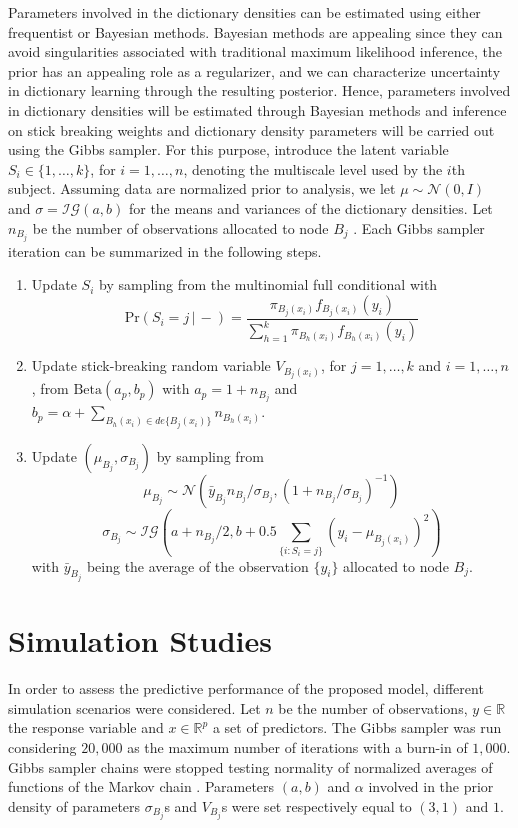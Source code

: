 \documentclass{article}
\newcommand{\Real}{\mathbb{R}}
\providecommand{\mc}[1]{\mathcal{#1}}
\begin{document}
Parameters involved in the dictionary densities can be estimated using either frequentist or Bayesian methods. Bayesian methods are appealing since they can avoid singularities associated with traditional maximum likelihood inference, the prior has an appealing role as a regularizer, and we can characterize uncertainty in dictionary learning through the resulting posterior.
Hence, parameters involved in dictionary densities will be estimated through Bayesian methods and inference on stick breaking weights and dictionary density parameters will be carried out using the Gibbs sampler. For this purpose, introduce the latent variable $S_i \in \{1,\ldots,k\}$, for $i=1,\ldots,n$, denoting the multiscale level used by the $i$th subject.  Assuming data are normalized prior to analysis, we let $\mu \sim \mc{N}(0,I)$ and $\sigma=\mc{IG}(a,b)$ for the means and variances of the dictionary densities. Let $n_{B_j}$ be  the number of observations allocated to node $B_j$ . Each Gibbs sampler iteration can be summarized in the following steps.
\begin{enumerate}
\item Update $S_i$ by sampling from the multinomial full conditional with 
\[\mbox{Pr}( S_i = j\, |\, -) = \frac{ \pi_{B_j(x_i)}f_{B_j(x_i)}(y_i) }{ \sum_{h=1}^k \pi_{B_h(x_i)}f_{B_h(x_i)}(y_i) } \label{eq:prS}\]
\item Update stick-breaking random variable $V_{B_j(x_i)}$, for $j=1, \ldots, k$ and $i=1, \ldots, n$, from $\mbox{Beta}(a_p,b_p)$ with $a_p=1+n_{B_j}$ and $b_p=\alpha+\sum_{B_h(x_i) \in de\{B_j(x_i)\}} n_{B_h(x_i)}$.
\item Update $(\mu_{B_j},\sigma_{B_j})$ by sampling from
\[  \mu_{B_j} \sim \mc{N}\left(\bar{y}_{B_j} n_{B_j}/\sigma_{B_j},(1+n_{B_j}/\sigma_{B_j})^{-1}\right)\]
\[  \sigma_{B_j} \sim \mc{IG}\left(a+n_{B_j}/2,b+0.5\sum_{\{i: S_i=j\}} \left(y_{i}-\mu_{B_j(x_i)}\right)^2\right)\]
with $\bar{y}_{B_j}$ being the average of the observation $\{y_i\}$ allocated to node $B_j$.

\end{enumerate}



\section{Simulation Studies}
In order to assess the predictive performance of the proposed model, different simulation scenarios were considered. Let $n$ be the number of observations, $y \in \Real$ the response variable and $x \in \Real^p$ a set of predictors. The Gibbs sampler was run considering $20,000$ as the maximum number of iterations with a burn-in of $1,000$. Gibbs sampler chains were stopped testing normality of normalized averages of functions of the Markov chain \cite{Chauveau98anautomated}. Parameters $(a,b)$ and $\alpha$ involved in the prior density of parameters $\sigma_{B_j}$s and $V_{B_j}$s were set respectively equal to $(3,1)$ and $1$.
\end{document}
